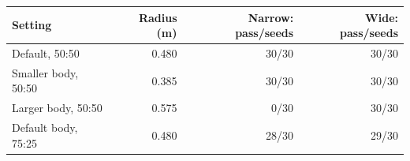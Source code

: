 \begin{tabular}{lrrr}
\toprule
Setting & Radius (m) & Narrow: pass/seeds & Wide: pass/seeds \\
\midrule
Default, 50:50 & 0.480 & 30/30 & 30/30 \\
Smaller body, 50:50 & 0.385 & 30/30 & 30/30 \\
Larger body, 50:50 & 0.575 & 0/30 & 30/30 \\
Default body, 75:25 & 0.480 & 28/30 & 29/30 \\
\bottomrule
\end{tabular}
